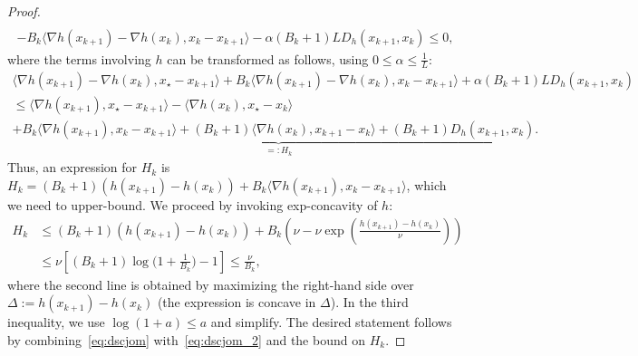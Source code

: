 \documentclass[a4paper]{article}
\renewcommand{\leq}{\leqslant}
\newcommand{\coloneqq}{:=}
\newcommand{\ip}[2]{\langle #1, #2\rangle}
\begin{document}
\begin{proof}
\begin{multline}
                \\
                - B_k\ip{\nabla h(x_{k+1}) - \nabla h(x_k)}{ x_k - x_{k+1}} - \alpha(B_k+1)L D_h(x_{k+1},x_k)
                \leq
                0,
        \end{multline}
        where the terms involving $h$ can be transformed as follows, using $0\leq \alpha\leq \tfrac1L$:
        \begin{multline}\label{eq:dscjom_2}
                \ip{\nabla h(x_{k+1}) - \nabla h(x_k)}{ x_\star - x_{k+1}} + B_k\ip{\nabla h(x_{k+1}) - \nabla h(x_k)}{ x_k - x_{k+1}} + \alpha (B_k+1) L D_h(x_{k+1},x_k)
                \\
                \leq
                \ip{\nabla h(x_{k+1})}{  x_\star - x_{k+1}} -  \ip{\nabla h(x_{k})}{  x_\star  - x_{k}}
                \\
                + \underbrace{B_k\ip{\nabla h(x_{k+1})}{ x_k - x_{k+1}} +(B_k+1)                            \ip{\nabla h(x_k)}{ x_{k+1}-x_k } +(B_k+1)D_h(x_{k+1},x_k)}_{=:H_k}
                .
        \end{multline}
        Thus, an expression for $H_k$ is $ H_k = (B_k+1)(h(x_{k+1}) - h(x_k)) + B_k\ip{\nabla h(x_{k+1})}{ x_k-x_{k+1}}$, 
        which we need to upper-bound.
        We proceed by invoking exp-concavity of $h$:
        \begin{align*}
                H_k &\leq (B_k+1)(h(x_{k+1}) - h(x_k)) +B_k\left(\nu -  \nu \exp\left(\tfrac{h(x_{k+1})-h(x_{k})}{\nu}\right)\right)
                \\
                &\leq \nu \left[(B_k+1)\log\bigl(1+\tfrac 1{B_k}\bigr) - 1\right]
                 \leq \frac{\nu}{B_k},
        \end{align*}
        where the second line is obtained by maximizing the right-hand side over $\Delta\coloneqq h(x_{k+1})-h(x_k)$ (the expression is concave in $\Delta$).
        In the third inequality, we use $\log(1+a)\leq a$ and simplify.
        The desired statement follows by combining~\eqref{eq:dscjom} with~\eqref{eq:dscjom_2} and the bound on $H_k$.
\end{proof}
\end{document}

